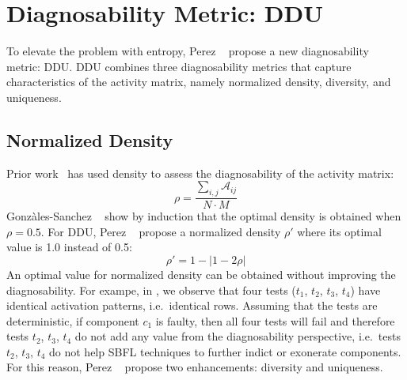 \documentclass[twoside,a4paper,11pt]{memoir}
\begin{document}
\section{Diagnosability Metric: DDU}
To elevate the problem with entropy, Perez \etal~\cite{DBLP:conf/icse/PerezAD17} propose a new diagnosability metric: DDU\@.
DDU combines three diagnosability metrics that capture characteristics of the activity matrix, namely normalized density, diversity, and uniqueness.

\subsection{Normalized Density}
Prior work~\cite{5954476} has used density to assess the diagnosability of the activity matrix:
\begin{equation}
  \rho = \frac{\sum_{i,j}\mathcal{A}_{ij}}{N \cdot M}
\end{equation}
Gonz\`ales-Sanchez \etal~\cite{5954476} show by induction that the optimal density is obtained when \(\rho = 0.5 \).
For DDU, Perez \etal~\cite{DBLP:conf/icse/PerezAD17} propose a normalized density \(\rho' \) where its optimal value is 1.0 instead of 0.5:
\begin{equation}
  \rho' = 1 - | 1 - 2 \rho |
\end{equation}
An optimal value for normalized density can be obtained without improving the diagnosability.
For exampe, in , we observe that four tests (\(t_1\), \(t_2\), \(t_3\), \(t_4\)) have identical activation patterns, i.e.\ identical rows.
Assuming that the tests are deterministic, if component \(c_1\) is faulty, then all four tests will fail and therefore tests \(t_2\), \(t_3\), \(t_4\) do not add any value from the diagnosability perspective, i.e.\ tests \(t_2\), \(t_3\), \(t_4\) do not help SBFL techniques to further indict or exonerate components.
For this reason, Perez \etal~\cite{DBLP:conf/icse/PerezAD17} propose two enhancements: diversity and uniqueness.
\end{document}
